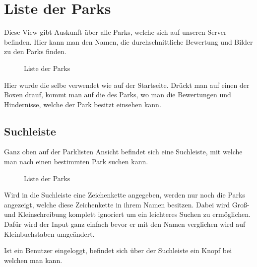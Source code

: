 \section{Liste der Parks}
\label{parklist}

Diese View gibt Auskunft über alle Parks, welche sich auf unseren Server befinden. Hier kann man den 
Namen, die durchschnittliche Bewertung und Bilder zu den Parks finden. 

\begin{figure}[H]
    \begin{center}
      \caption{Liste der Parks}
    \end{center}
\end{figure}

Hier wurde die selbe  verwendet wie auf der Startseite. Drückt man auf einen der 
Boxen drauf, kommt man auf die  des Parks, wo man die Bewertungen und Hindernisse,
welche der Park besitzt einsehen kann. 

\subsection{Suchleiste}

Ganz oben auf der Parklisten Ansicht befindet sich eine Suchleiste, mit welche man nach einen bestimmten 
Park suchen kann.

\begin{figure}[H]
    \begin{center}
      \caption{Liste der Parks}
    \end{center}
\end{figure}

Wird in die Suchleiste eine Zeichenkette angegeben, werden nur noch die Parks angezeigt, welche diese 
Zeichenkette in ihrem Namen besitzen. Dabei wird Groß- und Kleinschreibung komplett ignoriert um ein 
leichteres Suchen zu ermöglichen. Dafür wird der Input ganz einfach bevor er mit den Namen verglichen wird 
auf Kleinbuchstaben umgeändert.


Ist ein Benutzer eingeloggt, befindet sich über der Suchleiste ein Knopf bei welchen man 
kann.